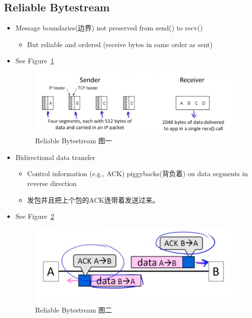 \documentclass[12pt]{ctexart}   %
\begin{document}
	\subsection{Reliable Bytestream}
	\begin{itemize}
		\item Message boundaries(边界) not preserved from send() to recv()
		\begin{itemize}
			\item But reliable and ordered (receive bytes in same order as sent)
		\end{itemize}
		\item See Figure~\ref{fig:6-8-1}
		  
		 \begin{figure}[h!] %
		\centering
		 \includegraphics[scale=0.7]{images/6-8-1}
		\caption{ Reliable Bytestream 图一}
		 \label{fig:6-8-1}
		 \end{figure}
		 
		 \item Bidirectional data transfer
		 \begin{itemize}
		 	\item Control information (e.g., ACK) piggybacks(背负着) on data segments in reverse direction
		 	\item 发包并且把上个包的ACK连带着发送过来。
		 \end{itemize}
		 \item See Figure~\ref{fig:6-8-2}
		  
		 \begin{figure}[h!] %
		\centering
		 \includegraphics[scale=0.7]{images/6-8-2}
		\caption{ Reliable Bytestream 图二 }
		 \label{fig:6-8-2}
		 \end{figure}
	\end{itemize}
	
\end{document}
